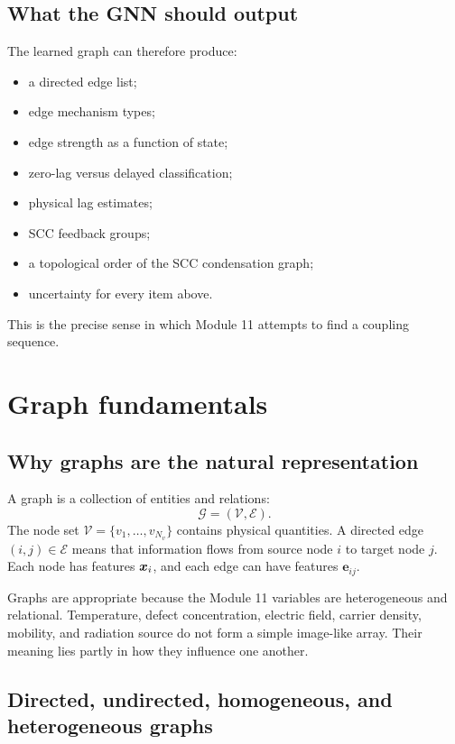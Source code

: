 \documentclass[11pt]{article}
\newcommand{\Gcal}{\mathcal{G}}
\newcommand{\Vcal}{\mathcal{V}}
\newcommand{\Ecal}{\mathcal{E}}
\newcommand{\evec}{\bm{e}}
\begin{document}
\subsection{What the GNN should output}

The learned graph can therefore produce:
\begin{itemize}[leftmargin=1.5em]
    \item a directed edge list;
    \item edge mechanism types;
    \item edge strength as a function of state;
    \item zero-lag versus delayed classification;
    \item physical lag estimates;
    \item SCC feedback groups;
    \item a topological order of the SCC condensation graph;
    \item uncertainty for every item above.
\end{itemize}
This is the precise sense in which Module 11 attempts to find a coupling sequence.

\section{Graph fundamentals}

\subsection{Why graphs are the natural representation}

A graph is a collection of entities and relations:
\begin{equation}
\Gcal=(\Vcal,\Ecal).
\end{equation}
The node set \(\Vcal=\{v_1,\ldots,v_{N_v}\}\) contains physical quantities. A directed edge \((i,j)\in\Ecal\) means that information flows from source node \(i\) to target node \(j\). Each node has features \(\bm{x}_i\), and each edge can have features \(\evec_{ij}\).

Graphs are appropriate because the Module 11 variables are heterogeneous and relational. Temperature, defect concentration, electric field, carrier density, mobility, and radiation source do not form a simple image-like array. Their meaning lies partly in how they influence one another.

\subsection{Directed, undirected, homogeneous, and heterogeneous graphs}
\end{document}
